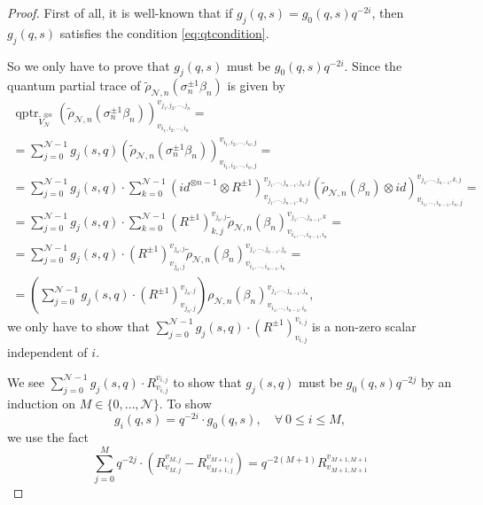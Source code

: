 \documentclass[reqno,a4paper,11pt]{amsart}
\numberwithin{equation}{section}
\numberwithin{figure}{section}
\theoremstyle{definition}
\theoremstyle{plain}
\newcommand{\qptr}{\operatorname{qptr}}
\newcommand{\cN}{\mathcal{N}}
\renewcommand{\leq}{\leqslant}
\begin{document}
\begin{proof}
First of all, it is well-known that if $g_j(q, s) = g_0(q, s)q^{-2i}$, then $g_j(q, s)$ satisfies the condition \eqref{eq:qtcondition}.

So we only have to prove that $g_j(q, s)$ must be $g_0(q, s)q^{-2i}$.  
Since the quantum partial trace of 
$\widetilde\rho_{\cN,n}(\sigma_n^{\pm1}\beta_n)$ 
is given by
%
\begin{multline*}
\qptr_{\widetilde{V}_{\cN}^{\otimes n}}\left(\widetilde\rho_{\cN,n}(\sigma_n^{\pm1}\beta_n)\right)_{v_{i_1,i_2, \cdots, i_n}}^{v_{j_1,j_2, \cdots, j_n}}
=
\\
=\sum_{j=0}^{\cN-1}g_j(s,q) \left(\widetilde\rho_{\cN,n}(\sigma_n^{\pm1}\beta_n)\right)_{v_{i_1,i_2, \cdots, i_n,j}}^{v_{i_1,i_2, \cdots, i_n,j}}
=
\\
=\sum_{j=0}^{\cN-1}g_j(s,q) \cdot 
\sum_{k=0}^{\cN-1}
(id^{\otimes n-1} \otimes R^{\pm1})_{v_{j_1, \cdots, j_{n-1},k,j}}^{v_{j_1, \cdots, j_{n-1},j_n,j}}
(\widetilde\rho_{\cN,n}(\beta_n)\otimes id)_{v_{i_1, \cdots,i_{n-1}, i_n,j}}^{v_{j_1, \cdots, j_{n-1},k,j}}
=
\\
=\sum_{j=0}^{\cN-1}g_j(s,q) \cdot 
\sum_{k=0}^{\cN-1}
(R^{\pm1})_{k,j}^{v_{j_n,j}}
\widetilde\rho_{\cN,n}(\beta_n)_{v_{i_1, \cdots,i_{n-1}, i_n}}^{v_{j_1, \cdots, j_{n-1},k}}
=
\\
=\sum_{j=0}^{\cN-1}g_j(s,q) \cdot 
(R^{\pm1})_{v_{j_n,j}}^{v_{j_n,j}}
\widetilde\rho_{\cN,n}(\beta_n)_{v_{i_1, \cdots,i_{n-1}, i_n}}^{v_{j_1, \cdots, j_{n-1},j_n}}
=
\\
=\left(\sum_{j=0}^{\cN-1}g_j(s,q) \cdot 
(R^{\pm1})_{v_{j_n,j}}^{v_{j_n,j}}
\right)
\rho_{\cN,n}(\beta_n)_{v_{i_1, \cdots,i_{n-1}, i_n}}^{v_{j_1, \cdots, j_{n-1},j_n}},
\end{multline*}
%
we only have to show that $\sum_{j=0}^{\cN-1}g_j(s,q) \cdot 
(R^{\pm1})_{v_{i,j}}^{v_{i,j}}$ is a non-zero scalar independent of $i$.  
\par
We see $\sum_{j=0}^{\cN-1}g_j(s,q) \cdot 
R_{v_{i,j}}^{v_{i,j}}$ to show that $g_j(s, q)$ must be $g_0(q,s) q^{-2j}$
by an induction on $M \in \{0,\dots,\cN\}$. 
To show
\begin{equation*}
g_i(q,s)=q^{-2i} \cdot g_0(q,s),\quad  \forall \  0\leq  i \leq M,
\end{equation*}
we use the fact
\begin{equation}
\sum_{j=0}^{M}q^{-2j} \cdot 
\left(R_{v_{M,j}}^{v_{M,j}}
-
R_{v_{M+1,j}}^{v_{M+1,j}}\right)
=
q^{-2(M+1)}R_{v_{M+1,M+1}}^{v_{M+1,M+1}}
\label{eq:sum}
\end{equation}

\end{proof}
\end{document}
